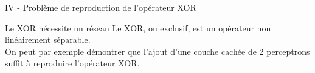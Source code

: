 \documentclass[10pt]{beamer}
\begin{document}
\begin{frame}{IV - Problème de reproduction de l'opérateur XOR}
\begin{block}{Le XOR nécessite un réseau}
Le XOR, ou exclusif, est un opérateur non linéairement séparable. \\
On peut par exemple démontrer que l'ajout d'une couche cachée de 2 perceptrons suffit à reproduire l'opérateur XOR. \\

\end{block}




\end{frame}
\end{document}
